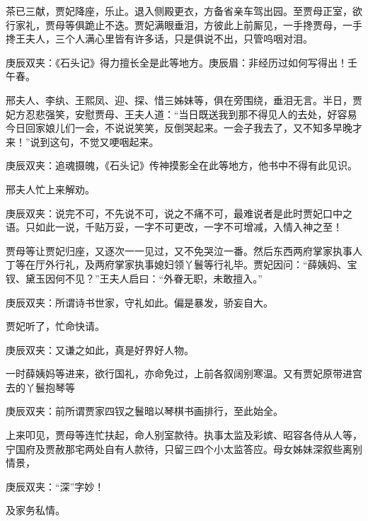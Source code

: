 \begin{parag}
    茶已三献，贾妃降座，乐止。退入侧殿更衣，方备省亲车驾出园。至贾母正室，欲行家礼，贾母等俱跪止不迭。贾妃满眼垂泪，方彼此上前厮见，一手搀贾母，一手搀王夫人，三个人满心里皆有许多话，只是俱说不出，只管呜咽对泪。\begin{note}庚辰双夹：《石头记》得力擅长全是此等地方。庚辰眉：非经历过如何写得出！壬午春。\end{note}邢夫人、李纨、王熙凤、迎、探、惜三姊妹等，俱在旁围绕，垂泪无言。半日，贾妃方忍悲强笑，安慰贾母、王夫人道：“当日既送我到那不得见人的去处，好容易今日回家娘儿们一会，不说说笑笑，反倒哭起来。一会子我去了，又不知多早晚才来！”说到这句，不觉又哽咽起来。\begin{note}庚辰双夹：追魂摄魄，《石头记》传神摸影全在此等地方，他书中不得有此见识。\end{note}邢夫人忙上来解劝。\begin{note}庚辰双夹：说完不可，不先说不可，说之不痛不可，最难说者是此时贾妃口中之语。只如此一说，千贴万妥，一字不可更改，一字不可增减，入情入神之至！\end{note}贾母等让贾妃归座，又逐次一一见过，又不免哭泣一番。然后东西两府掌家执事人丁等在厅外行礼，及两府掌家执事媳妇领丫鬟等行礼毕。贾妃因问：“薛姨妈、宝钗、黛玉因何不见？”王夫人启曰：“外眷无职，未敢擅入。”\begin{note}庚辰双夹：所谓诗书世家，守礼如此。偏是暴发，骄妄自大。\end{note}贾妃听了，忙命快请。\begin{note}庚辰双夹：又谦之如此，真是好界好人物。\end{note}一时薛姨妈等进来，欲行国礼，亦命免过，上前各叙阔别寒温。又有贾妃原带进宫去的丫鬟抱琴等\begin{note}庚辰双夹：前所谓贾家四钗之鬟暗以琴棋书画排行，至此始全。\end{note}上来叩见，贾母等连忙扶起，命人别室款待。执事太监及彩嫔、昭容各侍从人等，宁国府及贾赦那宅两处自有人款待，只留三四个小太监答应。母女姊妹深叙些离别情景，\begin{note}庚辰双夹：“深”字妙！\end{note}及家务私情。
\end{parag}


